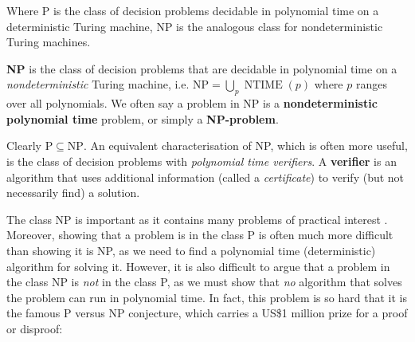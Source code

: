 Where P is the class of decision problems decidable in polynomial time on a deterministic Turing machine, NP is the analogous class for nondeterministic Turing machines.

\begin{definition}\label{def:class_NP}
  \textbf{NP} is the class of decision problems that are decidable in polynomial time on a \textit{nondeterministic} Turing machine, i.e. $\mathrm{NP} = \bigcup_p \operatorname{NTIME}(p)$ where $p$ ranges over all polynomials. We often say a problem in NP is a \textbf{nondeterministic polynomial time} problem, or simply a \textbf{NP-problem}.
\end{definition}

Clearly $\mathrm{P} \subseteq \mathrm{NP}$. An equivalent characterisation of NP, which is often more useful, is the class of decision problems with \textit{polynomial time verifiers}. A \textbf{verifier} is an algorithm that uses additional information (called a \textit{certificate}) to verify (but not necessarily find) a solution.


The class NP is important as it contains many problems of practical interest . Moreover, showing that a problem is in the class P is often much more difficult than showing it is NP, as we need to find a polynomial time (deterministic) algorithm for solving it. However, it is also difficult to argue that a problem in the class NP is \textit{not} in the class P, as we must show that \textit{no} algorithm that solves the problem can run in polynomial time. In fact, this problem is so hard that it is the famous $\mathrm{P}$ versus $\mathrm{NP}$ conjecture, which carries a US\$1 million prize for a proof or disproof:

\begin{conjecture}\label{conj:P_equals_NP}
\end{conjecture}

